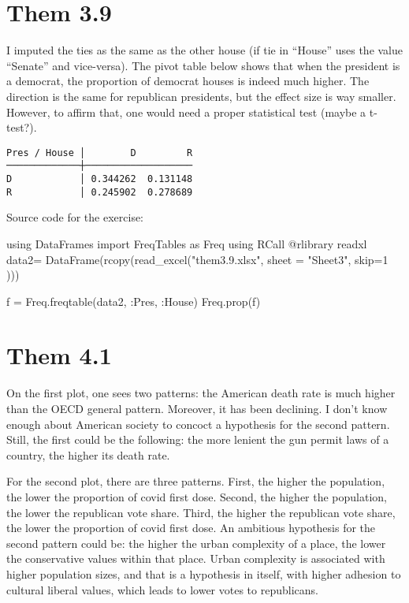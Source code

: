 \documentclass[11pt]{article}
\begin{document}
\section*{Them 3.9}
\label{sec:orgeb4238a}
I imputed the ties as the same as the other house (if tie in ``House'' uses the value ``Senate'' and vice-versa).
The pivot table below shows that when the president is a democrat, the proportion of democrat houses is indeed much higher. The direction is the same for republican presidents, but the effect size is way smaller. However, to affirm that, one would need a proper statistical test (maybe a t-test?).
\begin{verbatim}
Pres / House │        D         R
─────────────┼───────────────────
D            │ 0.344262  0.131148
R            │ 0.245902  0.278689
\end{verbatim}

Source code for the exercise:
\begin{jllisting}
using DataFrames
import FreqTables as Freq
using RCall
@rlibrary readxl
data2= DataFrame(rcopy(read_excel("them3.9.xlsx", sheet = "Sheet3", skip=1 )))

f = Freq.freqtable(data2, :Pres, :House)
Freq.prop(f)
\end{jllisting}

\section*{Them 4.1}
\label{sec:orge221fe1}
On the first plot, one sees two patterns: the American death rate is much higher than the OECD general pattern. Moreover, it has been declining. I don't know enough about American society to concoct a hypothesis for the second pattern. Still, the first could be the following: the more lenient the gun permit laws of a country, the higher its death rate.

For the second plot, there are three patterns. First, the higher the population, the lower the proportion of covid first dose. Second, the higher the population, the lower the republican vote share. Third, the higher the republican vote share, the lower the proportion of covid first dose. An ambitious hypothesis for the second pattern could be: the higher the urban complexity of a place, the lower the conservative values within that place. Urban complexity is associated with higher population sizes, and that is a hypothesis in itself, with higher adhesion to cultural liberal values, which leads to lower votes to republicans.
\end{document}
